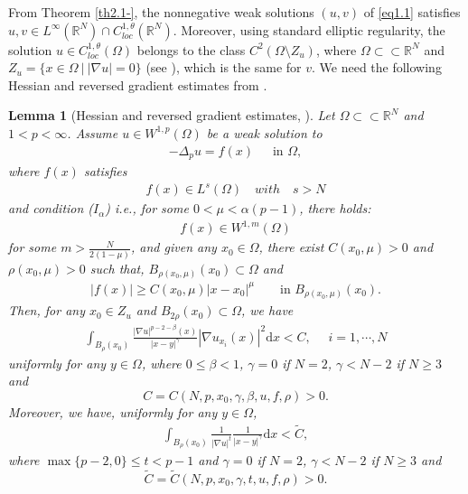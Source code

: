 \documentclass[12pt]{amsart}
\newtheorem{lem}[thm]{Lemma}
\theoremstyle{definition}
\theoremstyle{remark}
\theoremstyle{conclusion}
\theoremstyle{conjecture}
\numberwithin{equation}{section}
\newcommand{\R}{\mathbb{R}}
\begin{document}
\smallskip

From Theorem \ref{th2.1-}, the nonnegative weak solutions $(u,v)$ of \eqref{eq1.1} satisfies $u, v\in L^{\infty}(\mathbb{R}^{N})\cap C^{1,\theta}_{loc} (\R^N)$. Moreover, using standard elliptic regularity, the solution $u\in C_{loc}^{1,\theta} (\Omega)$ belongs to the class $C^2(\Omega\setminus Z_u)$, where $\Omega\subset\subset\R^N$ and $Z_u=\{ x\in\Omega \ | \ |\nabla u|=0 \}$ (see \cite{ED83,DGNT,PT}), which is the
same for $v$. We need the following Hessian and reversed gradient estimates from \cite{BSR14}.
\begin{lem}[Hessian and reversed gradient estimates, \cite{BSR14}] \label{lm.4}
Let $\Omega\subset\subset\R^N$ and $1<p<\infty$. Assume $u\in W^{1,p}(\Omega)$ be a weak solution to
\begin{align}\label{eq10.252252}
-\Delta_p u =f(x) \quad\,\,\,\mbox{in}\,\,\Omega,
\end{align}
where $f(x)$ satisfies
\begin{align}\label{eq26.30.001}
    f(x) \in L^s(\Omega) \quad with \quad s>N
\end{align}
and condition ($I_\alpha$)  i.e., for some $0<\mu<\alpha(p-1)$, there holds:
\begin{align}\label{eq26.30.002}
f(x)\in W^{1,m}(\Omega)
\end{align}
for some $m>\frac{N}{2(1-\mu)}$, and given any $x_0\in \Omega$, there exist $C(x_0,\mu)>0$ and $\rho(x_0,\mu)>0$ such that, $B_{\rho(x_0,\mu)}(x_{0})\subset \Omega$ and
\begin{align}\label{eq26.30.003}
|f(x)|\geq C(x_0,\mu) |x-x_0|^\mu \qquad \mbox{in}\,\,B_{\rho(x_0,\mu)}(x_{0}).
\end{align}
Then, for any $x_0\in Z_u$ and $B_{2\rho}(x_0)\subset \Omega$, we have
\begin{align}\label{eq10.25.52}
\int_{B_\rho(x_0)} \frac{|\nabla u|^{p-2-\beta}(x)}{|x-y|^\gamma} |\nabla  u_{x_i}(x)|^2 \mathrm{d}x < C,\quad\,\,i=1,\cdots,N
\end{align}
uniformly for any $y\in \Omega$, where $0\leq\beta<1$, $\gamma=0$ if $N=2$, $\gamma<N-2$ if $N \geq 3$ and
$$C=C(N,p,x_0,\gamma,\beta,u,f,\rho)>0.$$
Moreover, we have, uniformly for any $y\in \Omega$,
\begin{align}\label{eq10.25.2.1}
\int_{B_\rho(x_0)} \frac{1}{|\nabla u|^t} \frac{1}{|x-y|^\gamma}\mathrm{d}x <\widetilde{C},
\end{align}
where $\max\{p-2,0\}\leq t < p-1$ and $\gamma=0$ if $N=2$, $\gamma<N-2$ if $N \geq 3$ and $$\widetilde{C}=\widetilde{C}(N,p,x_0,\gamma,t,u,f,\rho)>0.$$
\end{lem}
\end{document}

